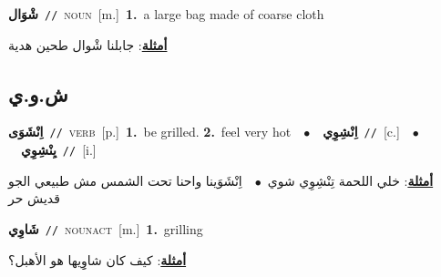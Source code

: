 \documentclass[10pt,a4paper,twoside]{article} %
\begin{document}
\begin{multicols}{2}
{\setlength\topsep{0pt}\textbf{\foreignlanguage{arabic}{شْوَال}}\ {\color{gray}\texttt{//}\color{black}}\ \textsc{noun}\ [m.]\ \textbf{1.}~a large bag made of coarse cloth\  \begin{flushright}\color{gray}\foreignlanguage{arabic}{\textbf{\underline{\foreignlanguage{arabic}{أمثلة}}}: جابلنا شْوال طحين هدية}\end{flushright}\color{black}} \vspace{2mm}

\vspace{-3mm}
\subsection*{\color{blue}\foreignlanguage{arabic}{ش.و.ي}\color{blue}{}} 

{\setlength\topsep{0pt}\textbf{\foreignlanguage{arabic}{اِنْشَوَى}}\ {\color{gray}\texttt{//}\color{black}}\ \textsc{verb}\ [p.]\ \textbf{1.}~be grilled.  \textbf{2.}~feel very hot\ \ $\bullet$\ \ \setlength\topsep{0pt}\textbf{\foreignlanguage{arabic}{اِنْشِوِي}}\ {\color{gray}\texttt{//}\color{black}}\ [c.]\ \ $\bullet$\ \ \setlength\topsep{0pt}\textbf{\foreignlanguage{arabic}{يِنْشِوِي}}\ {\color{gray}\texttt{//}\color{black}}\ [i.]\  \begin{flushright}\color{gray}\foreignlanguage{arabic}{\textbf{\underline{\foreignlanguage{arabic}{أمثلة}}}: خلي اللحمة تِنْشِوِي شوي\ $\bullet$\ \  اِنْشَوَينا واحنا تحت الشمس مش طبيعي الجو قديش حر}\end{flushright}\color{black}} \vspace{2mm}

{\setlength\topsep{0pt}\textbf{\foreignlanguage{arabic}{شَاوِي}}\ {\color{gray}\texttt{//}\color{black}}\ \textsc{noun\textunderscore act}\ [m.]\ \textbf{1.}~grilling\  \begin{flushright}\color{gray}\foreignlanguage{arabic}{\textbf{\underline{\foreignlanguage{arabic}{أمثلة}}}: كيف كان شاوِِيها هو الأهبل؟}\end{flushright}\color{black}} \vspace{2mm}


\end{multicols}
\end{document}
